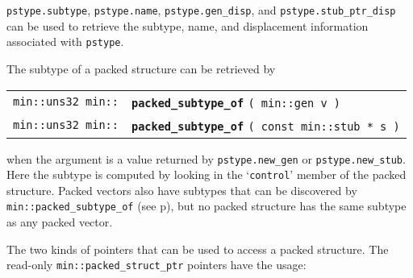 \documentclass[12pt]{article}
\makeatletter
\newcommand{\ttindex}[1]{\index{#1@{\tt #1}}}
\newcommand{\minindex}[1]{\ttindex{min::#1}\ttindex{#1}}
\newcommand{\pagref}[1]{p\pageref{#1}}
\newcommand{\EOL}{\penalty \exhyphenpenalty}
\newenvironment{indpar}[1][0.3in]%
	{\begin{list}{}%
		     {\setlength{\itemsep}{0in}%
		      \setlength{\topsep}{0in}%
		      \setlength{\parsep}{1ex}%
		      \setlength{\labelwidth}{#1}%
		      \setlength{\leftmargin}{#1}%
		      \addtolength{\leftmargin}{\labelsep}}%
	 \item}%
	{\end{list}}
\newcommand{\LABEL}[1]{\label{#1}}
\newcommand{\MINKEY}[1]{{\tt \bf #1}\minindex{#1}}
\makeatother
\begin{document}
\verb|pstype.subtype|, \verb|pstype.name|,
{\tt pstype.gen\_\EOL disp},
and {\tt pstype.stub\_\EOL ptr\_\EOL disp}
can be used to retrieve the subtype, name, and displacement
information associated with \verb|pstype|.

The subtype of a packed structure can be retrieved by

\begin{indpar}\begin{tabular}{r@{}l}
\verb|min::uns32 min::|
	& \MINKEY{packed\_subtype\_of} \verb|( min::gen v )|
\LABEL{PACKED_STRUCT_SUBTYPE_OF_GEN} \\
\verb|min::uns32 min::|
	& \MINKEY{packed\_subtype\_of} \verb|( const min::stub * s )|
\LABEL{PACKED_STRUCT_SUBTYPE_OF_STUB} \\
\end{tabular}\end{indpar}

when the argument is a value returned by
{\tt pstype.new\_\EOL gen} or {\tt pstype.new\_\EOL stub}.
Here the subtype is computed by looking in the
`{\tt control}' member of the packed structure.  Packed vectors
also have subtypes that can be discovered by
{\tt min::\EOL packed\_\EOL subtype\_\EOL of}
(see \pagref{PACKED_VEC_SUBTYPE_OF_GEN}),
but no packed structure
has the same subtype as any packed vector.

The two kinds of pointers that can be used to access
a packed structure.  The read-only
{\tt min::\EOL packed\_\EOL struct\_\EOL ptr\SARG} pointers
have the usage:
\end{document}
